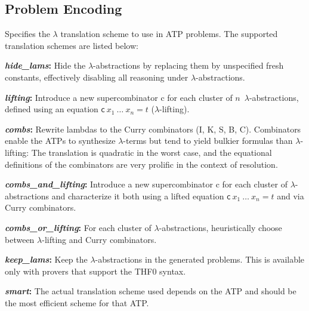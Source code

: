 \documentclass[a4paper,12pt]{article}
\newcommand\const[1]{\textsf{#1}}
\begin{document}
\subsection{Problem Encoding}
\label{problem-encoding}

\newcommand\comb[1]{\const{#1}}

\begin{enum}
Specifies the $\lambda$ translation scheme to use in ATP problems. The supported
translation schemes are listed below:

\begin{enum}
\item[\labelitemi] \textbf{\textit{hide\_lams}:} Hide the $\lambda$-abstractions
by replacing them by unspecified fresh constants, effectively disabling all
reasoning under $\lambda$-abstractions.

\item[\labelitemi] \textbf{\textit{lifting}:} Introduce a new
supercombinator \const{c} for each cluster of $n$~$\lambda$-abstractions,
defined using an equation $\const{c}~x_1~\ldots~x_n = t$ ($\lambda$-lifting).

\item[\labelitemi] \textbf{\textit{combs}:} Rewrite lambdas to the Curry
combinators (\comb{I}, \comb{K}, \comb{S}, \comb{B}, \comb{C}). Combinators
enable the ATPs to synthesize $\lambda$-terms but tend to yield bulkier formulas
than $\lambda$-lifting: The translation is quadratic in the worst case, and the
equational definitions of the combinators are very prolific in the context of
resolution.

\item[\labelitemi] \textbf{\textit{combs\_and\_lifting}:} Introduce a new
supercombinator \const{c} for each cluster of $\lambda$-abstractions and characterize it both using a
lifted equation $\const{c}~x_1~\ldots~x_n = t$ and via Curry combinators.

\item[\labelitemi] \textbf{\textit{combs\_or\_lifting}:} For each cluster of
$\lambda$-abstractions, heuristically choose between $\lambda$-lifting and Curry
combinators.

\item[\labelitemi] \textbf{\textit{keep\_lams}:}
Keep the $\lambda$-abstractions in the generated problems. This is available
only with provers that support the THF0 syntax.

\item[\labelitemi] \textbf{\textit{smart}:} The actual translation scheme used
depends on the ATP and should be the most efficient scheme for that ATP.
\end{enum}


\end{enum}
\end{document}
